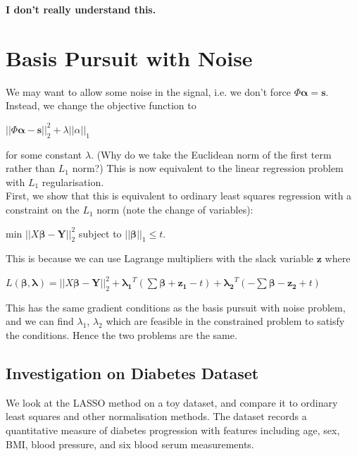 \documentclass[11pt,a4paper]{article}
\begin{document}
\textbf{I don't really understand this.} \\

\section{Basis Pursuit with Noise}
We may want to allow some noise in the signal, i.e. we don't force $\Phi \mathbf{\alpha} = \mathbf{s}$. Instead, we change the objective function to
\begin{center} $||\Phi \mathbf{\alpha} - \mathbf{s}||_2^2 + \lambda ||\alpha||_1$ \end{center}
for some constant $\lambda$. (Why do we take the Euclidean norm of the first term rather than $L_1$ norm?) This is now equivalent to the linear regression problem with $L_1$ regularisation. \\

First, we show that this is equivalent to ordinary least squares regression with a constraint on the $L_1$ norm (note the change of variables):
\begin{center} min $||X\mathbf{\beta} - \mathbf{Y}||_2^2$ subject to $||\mathbf{\beta}||_1 \leq t$. \end{center}
This is because we can use Lagrange multipliers with the slack variable $\mathbf{z}$ where
\begin{center}
	$L(\mathbf{\beta}, \mathbf{\lambda}) = ||X\mathbf{\beta} - \mathbf{Y}||_2^2 + \mathbf{\lambda_1}^T(\sum \mathbf{\beta} + \mathbf{z_1} - t) + \mathbf{\lambda_2}^T(-\sum \mathbf{\beta} - \mathbf{z_2} + t)$ \end{center}
This has the same gradient conditions as the basis pursuit with noise problem, and we can find $\lambda_1$, $\lambda_2$ which are feasible in the constrained problem to satisfy the conditions. Hence the two problems are the same. \\

\subsection{Investigation on Diabetes Dataset}
We look at the LASSO method on a toy dataset, and compare it to ordinary least squares and other normalisation methods. The dataset records a quantitative measure of diabetes progression with features including age, sex, BMI, blood pressure, and six blood serum measurements. \\
\end{document}
